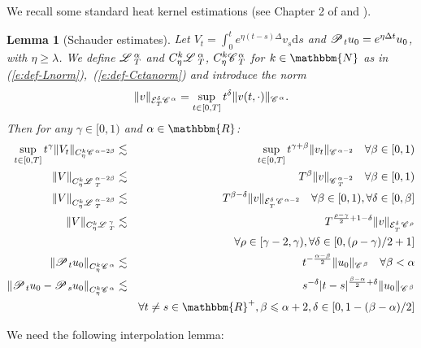 \documentclass{amsart}
\newcommand{\cdummy}{\cdot}
\newcommand{\mathd}{\mathrm{d}}
\newtheorem{lemma}[theorem]{Lemma}
\theoremstyle{remark}
\theoremstyle{definition}
\newcommand{\CC}{\mathscr{C} \hspace{.1em}}
\newcommand{\LL}{\mathscr{L} \hspace{.2em}}
\newcommand{\PP}{\mathscr{P} \hspace{.1em}}
\begin{document}
We recall some standard heat kernel estimations (see Chapter 2 of
{\cite{bahouri_fourier_2011}} and
{\cite{gubinelli_paracontrolled_2015,gubinelli_lectures_2015}}).

\begin{lemma}[Schauder estimates]
  \label{l:schauder}Let $V_t = \int_0^t e^{\eta (t - s) \Delta} v_s \mathd s$
  and $\PP_t u_0 = e^{\eta \Delta t} u_0$, with $\eta \geqslant \lambda$. We
  define $\LL^{\alpha}_T$ and $C_{\eta}^k \LL^{\alpha}_T$, $C_{\eta}^k
  \CC^{\alpha}_T$ for $k \in \mathbbm{N}$ as in
  (\ref{e:def-Lnorm}),~(\ref{e:def-Cetanorm}) and introduce the norm
  \[ \| v \|_{\mathcal{E}^{\delta}_T \CC^{\alpha}} = \sup_{t \in [0, T]}
     t^{\delta} \| v (t, \cdummy) \|_{\CC^{\alpha}} . \]
  Then for any $\gamma \in [0, 1)$ and $\alpha \in \mathbbm{R}$:
  \begin{eqnarray*}
    \sup_{t \in [0, T]} t^{\gamma} \| V_t \|_{C_{\eta}^k \CC^{\alpha - 2
    \beta}} & \lesssim & \sup_{t \in [0, T]} t^{\gamma + \beta} \| v_t
    \|_{\CC^{\alpha - 2}} \quad \forall \beta \in [0, 1)\\
    \| V \|_{C_{\eta}^k \LL^{\alpha - 2 \beta}_T} & \lesssim & T^{\beta} \| v
    \|_{\CC^{\alpha - 2}_T} \quad \forall \beta \in [0, 1)\\
    \| V \|_{C_{\eta}^k \LL_T^{\alpha - 2 \beta}} & \lesssim & T^{\beta -
    \delta} \| v \|_{\mathcal{E}^{\delta}_{_T} \CC^{\alpha - 2}} \quad \forall
    \beta \in [0, 1), \forall \delta \in [0, \beta]\\
    \| V \|_{C_{\eta}^k \LL_T^{\gamma}} & \lesssim & T^{\frac{\rho -
    \gamma}{2} + 1 - \delta} \| v \|_{\mathcal{E}^{\delta}_{_T} \CC^{\rho}}\\
    &  & \forall \rho \in [\gamma - 2, \gamma), \forall \delta \in [0, (\rho
    - \gamma) / 2 + 1]\\
    \left\| \PP_t u_0 \right\|_{C_{\eta}^k \CC^{\alpha}} & \lesssim & t^{-
    \frac{\alpha - \beta}{2}} \| u_0 \|_{\CC^{\beta}} \quad \forall \beta <
    \alpha\\
    \left\| \PP_t u_0 - \PP_s u_0 \right\|_{C_{\eta}^k \CC^{\alpha}} &
    \lesssim & s^{- \delta} | t - s |^{\frac{\beta - \alpha}{2} + \delta} \|
    u_0 \|_{\CC^{\beta}_{}}\\
    &  & \forall t \neq s \in \mathbbm{R}^+, \beta \leqslant \alpha + 2,
    \delta \in [0, 1 - (\beta - \alpha) / 2]
  \end{eqnarray*}
\end{lemma}

We need the following interpolation lemma:
\end{document}

